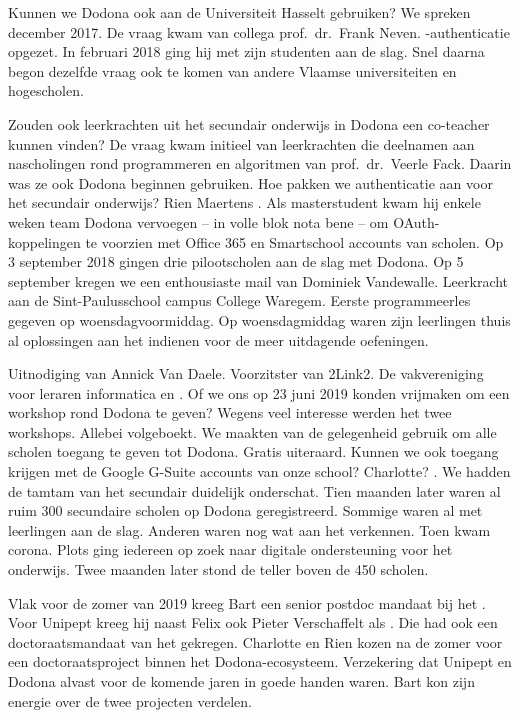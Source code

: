Kunnen we Dodona ook aan de Universiteit Hasselt gebruiken?
We spreken december 2017.
De vraag kwam van collega prof.\ dr.\ Frank Neven.
-authenticatie opgezet.
In februari 2018 ging hij met zijn studenten aan de slag.
Snel daarna begon dezelfde vraag ook te komen van andere Vlaamse universiteiten en hogescholen.

Zouden ook leerkrachten uit het secundair onderwijs in Dodona een co-teacher kunnen vinden?
De vraag kwam initieel van leerkrachten die deelnamen aan nascholingen rond programmeren en algoritmen van prof.\ dr.\ Veerle Fack.
Daarin was ze ook Dodona beginnen gebruiken.
Hoe pakken we authenticatie aan voor het secundair onderwijs?
Rien Maertens .
Als masterstudent kwam hij enkele weken team Dodona vervoegen -- in volle blok nota bene -- om OAuth-koppelingen te voorzien met Office 365 en Smartschool accounts van scholen.
Op 3 september 2018 gingen drie pilootscholen aan de slag met Dodona.
Op 5 september kregen we een enthousiaste mail van Dominiek Vandewalle.
Leerkracht  aan de Sint-Paulusschool campus College Waregem.
Eerste programmeerles gegeven op woensdagvoormiddag.
Op woensdagmiddag waren zijn leerlingen thuis al oplossingen aan het indienen voor de meer uitdagende oefeningen.

Uitnodiging van Annick Van Daele.
Voorzitster van 2Link2.
De vakvereniging voor leraren informatica en .
Of we ons op 23 juni 2019 konden vrijmaken om een workshop rond Dodona te geven?
Wegens veel interesse werden het twee workshops.
Allebei volgeboekt.
We maakten van de gelegenheid gebruik om alle scholen toegang te geven tot Dodona.
Gratis uiteraard.
Kunnen we ook toegang krijgen met de Google G-Suite accounts van onze school?
Charlotte?
.
We hadden de tamtam van het secundair duidelijk onderschat.
Tien maanden later waren al ruim 300 secundaire scholen op Dodona geregistreerd.
Sommige waren al met leerlingen aan de slag.
Anderen waren nog wat aan het verkennen.
Toen kwam corona.
Plots ging iedereen op zoek naar digitale ondersteuning voor het onderwijs.
Twee maanden later stond de teller boven de 450 scholen.

Vlak voor de zomer van 2019 kreeg Bart een senior postdoc mandaat bij het \@.
Voor Unipept kreeg hij naast Felix ook Pieter Verschaffelt als .
Die had ook een doctoraatsmandaat van het  gekregen.
Charlotte en Rien kozen na de zomer voor een doctoraatsproject binnen het Dodona-ecosysteem.
Verzekering dat Unipept en Dodona alvast voor de komende jaren in goede handen waren.
Bart kon zijn energie over de twee projecten verdelen.

